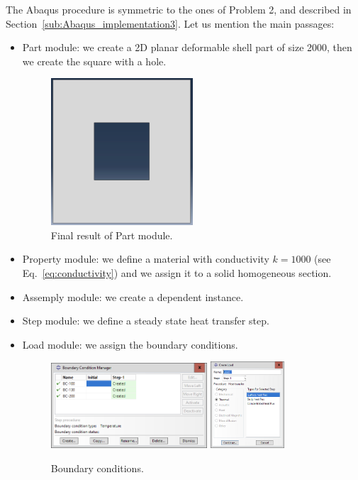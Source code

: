 The Abaqus procedure is symmetric to the ones of Problem 2, and described in Section~\ref{sub:Abaqus_implementation3}. Let us mention the main passages:
\begin{itemize}
\item Part module: we create a 2D planar deformable shell part of size 2000, then we create the square with a hole.
\begin{figure}[H]
    \centering
    \includegraphics[width=0.5\textwidth]{Images/ab3/ab1.png}
    \caption{Final result of Part module.}
    \label{fig:abb1}
\end{figure}

\item Property module: we define a material with conductivity $k=1000$ (see Eq.~\eqref{eq:conductivity}) and we assign it to a solid homogeneous section.

\item Assemply module: we create a dependent instance.

\item Step module: we define a steady state heat transfer step.

\item Load module: we assign the boundary conditions.
\begin{figure}[H]
    \centering
    \includegraphics[width=0.55\textwidth]{Images/ab3/ab2.png} \qquad 
    \includegraphics[width=0.26\textwidth]{Images/ab3/ab3.png}
    \caption{Boundary conditions.}
    \label{fig:abb23}
\end{figure}


\end{itemize}

